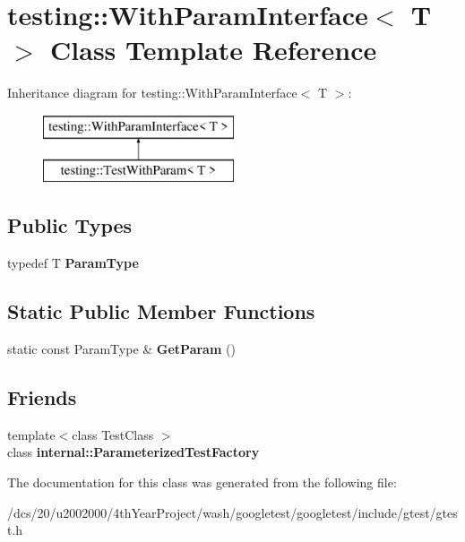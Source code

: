 \hypertarget{classtesting_1_1WithParamInterface}{}\section{testing\+:\+:With\+Param\+Interface$<$ T $>$ Class Template Reference}
\label{classtesting_1_1WithParamInterface}
Inheritance diagram for testing\+:\+:With\+Param\+Interface$<$ T $>$\+:\begin{figure}[H]
\begin{center}
\leavevmode
\includegraphics[height=2.000000cm]{classtesting_1_1WithParamInterface}
\end{center}
\end{figure}
\subsection*{Public Types}
\begin{DoxyCompactItemize}
\item 
\mbox{\label{classtesting_1_1WithParamInterface_a343febaaebf1f025bda484f841d4fec1}} 
typedef T {\bfseries Param\+Type}
\end{DoxyCompactItemize}
\subsection*{Static Public Member Functions}
\begin{DoxyCompactItemize}
\item 
\mbox{\label{classtesting_1_1WithParamInterface_a1078d4493d7aa4d3e50d1d6c661bee4d}} 
static const Param\+Type \& {\bfseries Get\+Param} ()
\end{DoxyCompactItemize}
\subsection*{Friends}
\begin{DoxyCompactItemize}
\item 
\mbox{\label{classtesting_1_1WithParamInterface_a7543eb7df89f00fff517dba24bc11dd5}} 
{\footnotesize template$<$class Test\+Class $>$ }\\class {\bfseries internal\+::\+Parameterized\+Test\+Factory}
\end{DoxyCompactItemize}


The documentation for this class was generated from the following file\+:\begin{DoxyCompactItemize}
\item 
/dcs/20/u2002000/4th\+Year\+Project/wash/googletest/googletest/include/gtest/gtest.\+h\end{DoxyCompactItemize}
